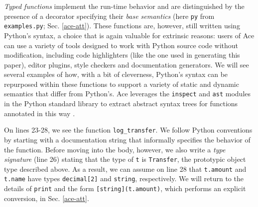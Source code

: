 \emph{Typed functions} implement the run-time behavior and are distinguished by the presence of a decorator specifying their  \emph{base semantics} (here \verb|py| from \verb|examples.py|; Sec. \ref{ace-att}). These functions are, however, still written using Python's syntax, a choice that is again valuable for extrinsic reasons: users of Ace can use a variety of  tools designed to work with Python source code  without  modification, including code highlighters (like the one used in generating this paper), editor plugins, style checkers and documentation generators. We will see several examples of how, with a bit of cleverness, Python's syntax can be repurposed within these functions to support a variety of static and dynamic semantics that differ from Python's. Ace  leverages the \verb|inspect| and \verb|ast| modules in the Python standard library to extract abstract syntax trees for functions annotated in this way \cite{python}. 

On lines 23-28, we see the function \verb|log_transfer|. We follow Python conventions by starting with a documentation string  that informally specifies the behavior of the function. Before moving into the body, however, we  also write a \emph{type signature} (line 26) stating that the type of \verb|t| is \verb|Transfer|, the prototypic object type described above. As a result, we can assume on line 28 that \verb|t.amount| and \verb|t.name| have types \verb|decimal[2]| and \verb|string|, respectively. We will return to the details of \verb|print| and the form \verb|[string](t.amount)|, which performs an explicit conversion, in Sec. \ref{ace-att}.

